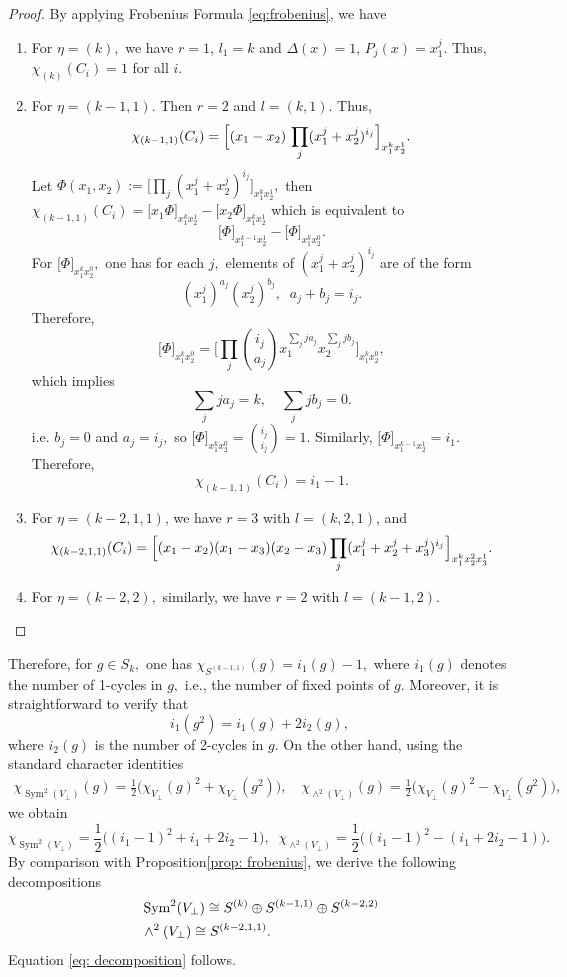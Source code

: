 \documentclass{amsart}%
\begin{document}
\begin{proof} By applying Frobenius Formula \eqref{eq:frobenius}, we have
\begin{enumerate}
\item[(a)] For $\eta = (k),$ we have $r=1$, $l_1 = k$ and $\Delta(x)=1$, $P_j(x)=x_1^j$.
Thus, $\chi_{(k)}(C_i) = 1$ for all $i$.
\item[(b)] For $\eta = (k-1,1)$. Then $r=2$ and $l=(k,1).$ Thus,
\[
\chi_{(k-1,1)}(C_i)
=
\Bigl[
(x_1-x_2)\,
\prod_j (x_1^j + x_2^j)^{i_j}
\Bigr]_{x_1^{k}x_2^{1}}.
\]
Let $\Phi(x_1,x_2):=\Bigr[\prod_j (x_1^j + x_2^j)^{i_j}
\Bigr]_{x_1^{k}x_2^{1}},$ then $
\chi_{(k-1,1)}(C_i)=\Bigr[x_1\Phi\Bigr]_{x_1^{k}x_2^{1}}-\Bigr[x_2\Phi\Bigr]_{x_1^{k}x_2^{1}}$ which is equivalent to 
\[
\Bigr[\Phi\Bigr]_{x_1^{k-1}x_2^{1}}-\Bigr[\Phi\Bigr]_{x_1^{k}x_2^{0}}.
\]
For $\Bigr[\Phi\Bigr]_{x_1^{k}x_2^{0}},$ one has for each $j,$ elements of $(x_1^j+x_2^j)^{i_j}$ are of the form 
\[
(x_1^j)^{a_j}(x_2^j)^{b_j},\;\;a_j+b_j=i_j.
\]
Therefore, 
\[
\Bigr[\Phi\Bigr]_{x_1^{k}x_2^{0}}=\Bigr[\prod_{j}\binom{i_j}{a_j}x_1^{\sum_j ja_j}x_2^{\sum_j jb_j}\Bigr]_{x_1^kx_2^0},
\]
which implies
\[
\sum_j ja_j = k,\quad
\sum_j jb_j=0.
\]
i.e. $b_j=0$ and $a_j=i_j,$ so $\Bigr[\Phi\Bigr]_{x_1^{k}x_2^{0}}=\binom{i_j}{i_j}=1.$ Similarly, $\Bigr[\Phi\Bigr]_{x_1^{k-1}x_2^{1}}=i_1.$
Therefore,
\[
\chi_{(k-1,1)}(C_i) = i_1 - 1.
\]
\item[(c)] For $\eta= (k-2,1,1)$, we have $r=3$ with $l = (k,2,1)$, and
\[
\chi_{(k-2,1,1)}(C_i)
=
\Bigl[
(x_1-x_2)(x_1-x_3)(x_2-x_3)
\prod_j (x_1^j + x_2^j + x_3^j)^{i_j}
\Bigr]_{x_1^{k}x_2^{2}x_3^{1}}.
\]
\item[(d)] For $\eta = (k-2,2),$ similarly, we have $r=2$ with $l = (k-1,2)$.
\end{enumerate}
\end{proof}
\vskip0.3cm
\noindent Therefore, for $g\in S_k,$ one has $\chi_{S^{(k-1,1)}}(g)=i_1(g)-1,$ where $i_1(g)$ denotes the number of 1-cycles in $g,$ i.e., the number of fixed points of $g.$ Moreover, it is straightforward to verify that 
\[
i_1(g^2)=i_1(g)+2i_2(g),
\]
where $i_2(g)$ is the number of 2-cycles in $g$.
On the other hand, using the standard character identities
\begin{align*}
\chi_{\operatorname{Sym}^2(V_{\perp})}(g)=\frac{1}{2}\Big(\chi_{V_{\perp}}(g)^2+\chi_{V_{\perp}}(g^2)\Big),\quad
\chi_{\wedge^2(V_{\perp})}(g)=\frac{1}{2}\Big(\chi_{V_{\perp}}(g)^2-\chi_{V_{\perp}}(g^2)\Big),
\end{align*}
we obtain
\[
\chi_{\operatorname{Sym}^2(V_{\perp})}=\frac{1}{2}\Big((i_1-1)^2+i_1+2i_2-1\Big),\;\;
    \chi_{\wedge^2(V_{\perp})}=\frac{1}{2}\Big((i_1-1)^2-(i_1+2i_2-1)\Big).
\]
By comparison with Proposition\eqref{prop: frobenius}, we derive the following decompositions
\begin{align*}
&\operatorname{Sym}^2(V_{\perp})\cong S^{(k)}\oplus S^{(k-1,1)}\oplus S^{(k-2,2)}\\
&\wedge^2(V_{\perp})\cong S^{(k-2,1,1)}.\notag 
\end{align*}
Equation \eqref{eq: decomposition} follows.
\end{document}
